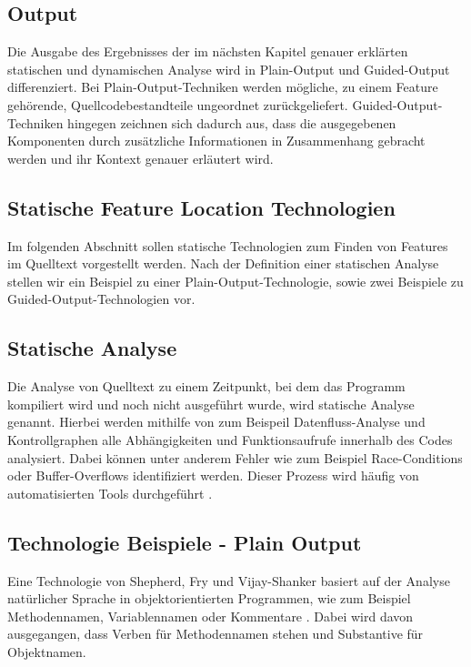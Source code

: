 \documentclass[runningheads,a4paper]{llncs}
\begin{document}
\subsection*{Output}

Die Ausgabe des Ergebnisses der im nächsten Kapitel genauer erklärten statischen und dynamischen Analyse wird in Plain-Output und Guided-Output differenziert. Bei Plain-Output-Techniken werden mögliche, zu einem Feature gehörende, Quellcodebestandteile ungeordnet zurückgeliefert. Guided-Output-Techniken hingegen zeichnen sich dadurch aus, dass die ausgegebenen Komponenten durch zusätzliche Informationen in Zusammenhang gebracht werden und ihr Kontext genauer erläutert wird.

\subsection{Statische Feature Location Technologien}\label{static}

Im folgenden Abschnitt sollen statische Technologien zum Finden von Features im Quelltext vorgestellt werden. Nach der Definition einer statischen Analyse stellen wir ein Beispiel zu einer Plain-Output-Technologie, sowie zwei Beispiele zu Guided-Output-Technologien vor.

\subsection*{Statische Analyse}

Die Analyse von Quelltext zu einem Zeitpunkt, bei dem das Programm kompiliert wird und noch nicht ausgeführt wurde, wird statische Analyse genannt. Hierbei werden mithilfe von zum Beispeil Datenfluss-Analyse und Kontrollgraphen alle Abhängigkeiten und Funktionsaufrufe innerhalb des Codes analysiert. Dabei können unter anderem Fehler wie zum Beispiel Race-Conditions oder Buffer-Overflows identifiziert werden. Dieser Prozess wird häufig von automatisierten Tools durchgeführt \cite{static}.

\subsection*{Technologie Beispiele - Plain Output}

Eine Technologie von Shepherd, Fry und Vijay-Shanker basiert auf der Analyse natürlicher Sprache in objektorientierten Programmen, wie zum Beispiel Methodennamen, Variablennamen oder Kommentare \cite{shepherd}. Dabei wird davon ausgegangen, dass Verben für Methodennamen stehen und Substantive für Objektnamen.
\end{document}
